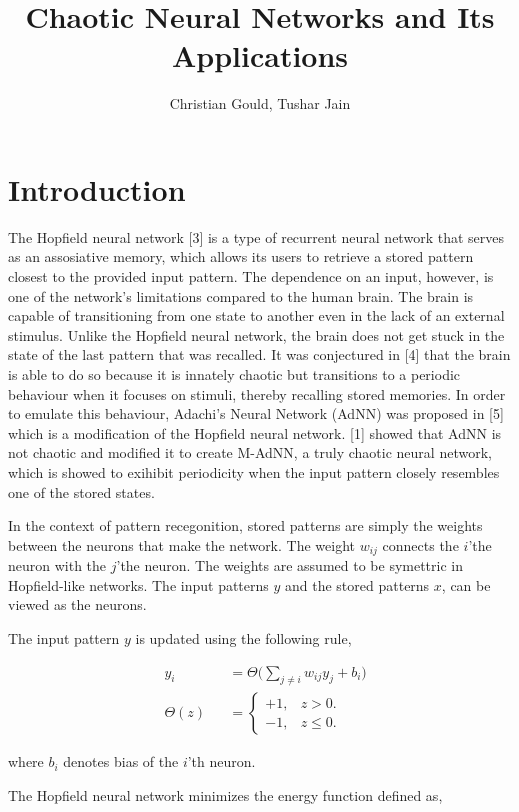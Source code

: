 \documentclass[12pt, letterpaper]{article}
\title{Chaotic Neural Networks and Its Applications}
\author{Christian Gould, Tushar Jain}
\date{}
\begin{document}
\maketitle

\section*{Introduction}

The Hopfield neural network [3] is a type of recurrent neural network that serves as an assosiative memory, which allows its users to retrieve a stored pattern closest to the provided input pattern. The dependence on an input, however, is one of the network's limitations compared to the human brain. The brain is capable of transitioning from one state to another even in the lack of an external stimulus. Unlike the Hopfield neural network, the brain does not get stuck in the state of the last pattern that was recalled. It was conjectured in [4] that the brain is able to do so because it is innately chaotic but transitions to a periodic behaviour when it focuses on stimuli, thereby recalling stored memories. In order to emulate this behaviour, Adachi’s Neural Network (AdNN) was proposed in [5] which is a modification of the Hopfield neural network. [1] showed that AdNN is not chaotic and modified it to create M-AdNN, a truly chaotic neural network, which is showed to exihibit periodicity when the input pattern closely resembles one of the stored states.

In the context of pattern recegonition, stored patterns are simply the weights between the neurons that make the network. The weight $w_{ij}$ connects the $i$'the neuron with the $j$'the neuron. The weights are assumed to be symettric in Hopfield-like networks. The input patterns $y$ and the stored patterns $x$, can be viewed as the neurons.

The input pattern $y$ is updated using the following rule,

$$
\begin{aligned}
& y_i &&= \Theta\big(\sum_{j \neq i} w_{ij}y_j + b_i \big)\\
& \Theta(z) &&= \begin{cases}
  +1, & z > 0.\\
  -1, & z \le 0.
  \end{cases}
\end{aligned}
$$

where $b_i$ denotes bias of the $i$'th neuron.

The Hopfield neural network minimizes the energy function defined as,
\end{document}
